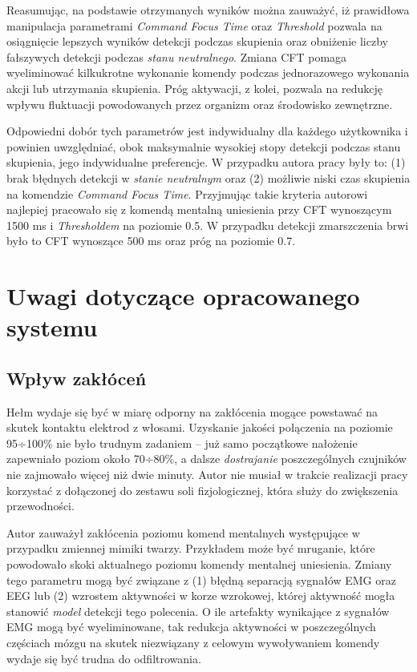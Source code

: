 \documentclass[skorowidz,skroty]{dyplomWEZUT}
\begin{document}
Reasumując, na podstawie otrzymanych wyników można zauważyć, iż prawidłowa manipulacja parametrami \textit{Command Focus Time} oraz \textit{Threshold} pozwala na osiągnięcie lepszych wyników detekcji podczas skupienia oraz obniżenie liczby fałszywych detekcji podczas \textit{stanu neutralnego}. Zmiana CFT pomaga wyeliminować kilkukrotne wykonanie komendy podczas jednorazowego wykonania akcji lub utrzymania skupienia. Próg aktywacji, z kolei, pozwala na redukcję wpływu fluktuacji powodowanych przez organizm oraz środowisko zewnętrzne. 

Odpowiedni dobór tych parametrów jest indywidualny dla każdego użytkownika i powinien uwzględniać, obok maksymalnie wysokiej stopy detekcji podczas stanu skupienia, jego indywidualne preferencje. W przypadku autora pracy były to: (1) brak błędnych detekcji w \textit{stanie neutralnym} oraz (2) możliwie niski czas skupienia na komendzie \textit{Command Focus Time}. Przyjmując takie kryteria autorowi najlepiej pracowało się z komendą mentalną uniesienia przy CFT wynoszącym 1500 ms i \textit{Thresholdem} na poziomie 0.5. W przypadku detekcji zmarszczenia brwi było to CFT wynoszące 500 ms oraz próg na poziomie 0.7.


\section{Uwagi dotyczące opracowanego systemu}
\subsection{Wpływ zakłóceń}
Hełm wydaje się być w miarę odporny na zakłócenia mogące powstawać na skutek kontaktu elektrod z włosami. Uzyskanie jakości połączenia na poziomie 95÷100\% nie było trudnym zadaniem -- już samo początkowe nałożenie zapewniało poziom około 70÷80\%, a dalsze \textit{dostrajanie} poszczególnych czujników nie zajmowało więcej niż dwie minuty. Autor nie musiał w trakcie realizacji pracy korzystać z dołączonej do zestawu soli fizjologicznej, która służy do zwiększenia przewodności.

Autor zauważył zakłócenia poziomu komend mentalnych występujące w przypadku zmiennej mimiki twarzy. Przykładem może być mruganie, które powodowało skoki aktualnego poziomu komendy mentalnej uniesienia. Zmiany tego parametru mogą być związane z (1) błędną separacją sygnałów EMG oraz EEG lub (2) wzrostem aktywności w korze wzrokowej, której aktywność mogła stanowić \textit{model} detekcji tego polecenia. O ile artefakty wynikające z sygnałów EMG mogą być wyeliminowane, tak redukcja aktywności w poszczególnych częściach mózgu na skutek niezwiązany z celowym wywoływaniem komendy wydaje się być trudna do odfiltrowania.
\end{document}
